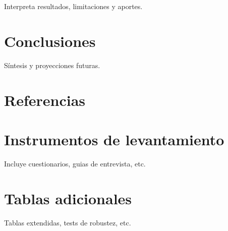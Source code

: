 \documentclass[
  spanish,
  a4paper,
  oneside]{scrbook}
\begin{document}
Interpreta resultados, limitaciones y aportes.


\chapter{Conclusiones}\label{conclusiones}

Síntesis y proyecciones futuras.


\chapter{Referencias}\label{referencias}

\protect{}\label{refs}

\cleardoublepage
{}
{}
\appendix

\chapter{Instrumentos de
levantamiento}\label{instrumentos-de-levantamiento}

Incluye cuestionarios, guias de entrevista, etc.

\chapter{Tablas adicionales}\label{tablas-adicionales}

Tablas extendidas, tests de robustez, etc.


\backmatter

\mainmatter
\pagestyle{scrheadings}

\end{document}
